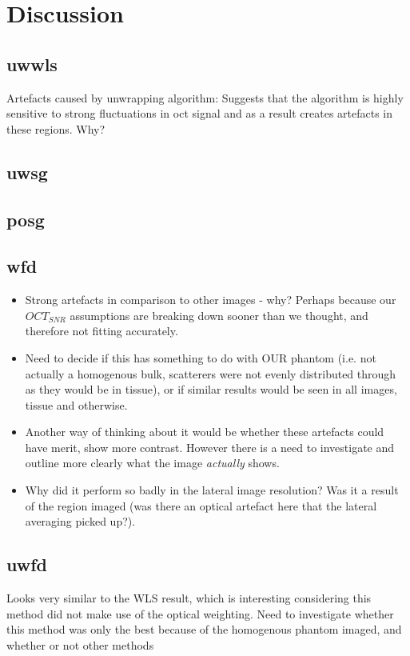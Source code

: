\chapter{Discussion}

\section{\ac{uwwls}}
Artefacts caused by unwrapping algorithm: Suggests that the algorithm is highly sensitive to strong fluctuations in \ac{oct} signal and as a result creates artefacts in these regions. Why?

\section{\ac{uwsg}}

\section{\ac{posg}}

\section{\ac{wfd}}
\begin{itemize}
	\item Strong artefacts in comparison to other images - why? Perhaps because our $OCT_{SNR}$ assumptions are breaking down sooner than we thought, and therefore not fitting accurately.
	\item Need to decide if this has something to do with OUR phantom (i.e. not actually a homogenous bulk, scatterers were not evenly distributed through as they would be in tissue), or if similar results would be seen in all images, tissue and otherwise.
	\item Another way of thinking about it would be whether these artefacts could have merit, show more contrast. However there is a need to investigate and outline more clearly what the image \textit{actually} shows. 
	\item Why did it perform so badly in the lateral image resolution? Was it a result of the region imaged (was there an optical artefact here that the lateral averaging picked up?).
\end{itemize}

\section{\ac{uwfd}}
	Looks very similar to the WLS result, which is interesting considering this method did not make use of the optical weighting. Need to investigate whether this method was only the best because of the homogenous phantom imaged, and whether or not other methods 

